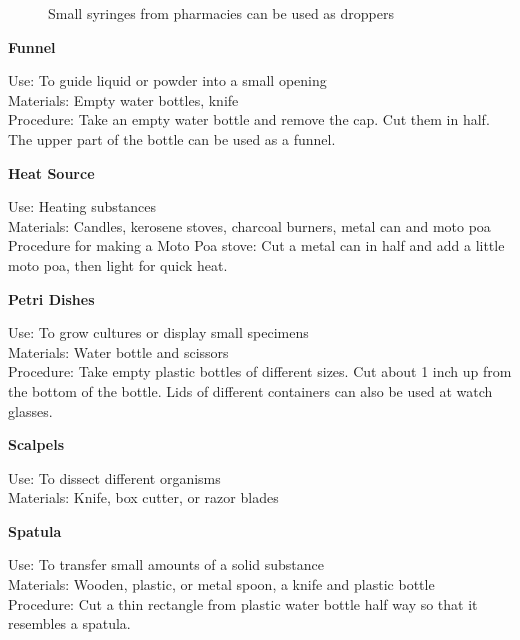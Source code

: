 \begin{figure}[h]
\begin{center}
\def\svgwidth{3cm}

\caption{Small syringes from pharmacies can be used as droppers}
\label{fig:droppers}
\end{center}
\end{figure}

\begin{flushleft}
\textbf{Funnel}
\end{flushleft}
\vspace{-10pt}
Use: To guide liquid or powder into a small opening\\
Materials: Empty water bottles, knife\\
Procedure: Take an empty water bottle and remove the cap. Cut them in half. The upper part of the bottle can be used as a funnel.\\

\begin{flushleft}
\textbf{Heat Source}
\end{flushleft}
\vspace{-10pt}
Use: Heating substances\\
Materials: Candles, kerosene stoves, charcoal burners, metal can and moto poa\\
Procedure for making a Moto Poa stove: Cut a metal can in half and add a little moto poa, then light for quick heat.\\


\begin{flushleft}
\textbf{Petri Dishes}
\end{flushleft}
\vspace{-10pt}
Use: To grow cultures or display small specimens\\
Materials: Water bottle and scissors\\
Procedure: Take empty plastic bottles of different sizes. Cut about 1 inch up from the bottom of the bottle. Lids of different containers can also be used at watch glasses.\\

\begin{flushleft}
\textbf{Scalpels}
\end{flushleft}
\vspace{-10pt}
Use: To dissect different organisms \\
Materials: Knife, box cutter, or razor blades\\


\begin{flushleft}
\textbf{Spatula}
\end{flushleft}
\vspace{-10pt}
Use: To transfer small amounts of a solid substance\\
Materials: Wooden, plastic, or metal spoon, a knife and plastic bottle\\
Procedure: Cut a thin rectangle from plastic water bottle half way so that it resembles a spatula.\\

